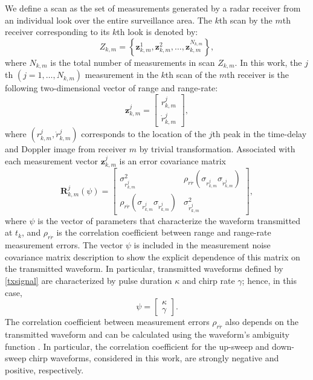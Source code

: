 \documentclass[times]{asjcauth}
\begin{document}
We define a scan as the set of measurements generated by a radar receiver from an individual look over the entire surveillance area. The $k$th scan by the $m$th receiver corresponding to its $k$th look is denoted by:
\begin{equation*}
Z_{k,m} =
\left\{\mathbf{z}_{k,m}^{1},\mathbf{z}_{k,m}^{2},\ldots,\mathbf{z}_{k,m}^{N_{k,m}}\right\},
\end{equation*}
where $N_{k,m}$ is the total number of measurements in scan $Z_{k,m}$. In this work, the $j$th $\left(j=1,\ldots,N_{k,m}\right)$ measurement in the $k$th scan of the $m$th receiver is the following two-dimensional vector of range and range-rate:
\begin{equation*}
\mathbf{z}_{k,m}^{j} = \left[
\begin{array}{c}
  r_{k,m}^{j} \\
  \dot{r}_{k,m}^{j}
\end{array}
\right],
\end{equation*}
\noindent where $\left(r_{k,m}^{j},\dot{r}_{k,m}^{j}\right)$ corresponds to the location of the $j$th peak in the time-delay and Doppler image from receiver $m$ by trivial transformation. Associated with each measurement vector $\mathbf{z}_{k,m}^{j}$ is an error covariance matrix
\begin{equation*}
\mathbf{R}_{k,m}^{j}(\psi) = \left[
\begin{array}{cc}
  \sigma_{r_{k,m}^{j}}^{2} & \rho_{r\dot{r}}\left(\sigma_{r_{k,m}^{j}}\sigma_{\dot{r}_{k,m}^{j}}\right)\\
  \rho_{r\dot{r}}\left(\sigma_{r_{k,m}^{j}}\sigma_{\dot{r}_{k,m}^{j}}\right) & \sigma_{\dot{r}_{k,m}^{j}}^{2}
\end{array}
\right],
\end{equation*}
\noindent where $\psi$ is the vector of parameters that characterize the waveform transmitted at $t_{k}$, and $\rho_{r\dot{r}}$ is the correlation coefficient between range and range-rate measurement errors. The vector $\psi$ is included in the measurement noise covariance matrix description to show the explicit dependence of this matrix on the transmitted waveform. In particular, transmitted waveforms defined by \eqref{txsignal} are characterized by pulse duration $\kappa$ and chirp rate $\gamma$; hence, in this case,
\begin{equation*}
\psi = \left[\begin{array}{c}
               \kappa \\
               \gamma
             \end{array}
\right].
\end{equation*}
\noindent The correlation coefficient between measurement errors $\rho_{r\dot{r}}$ also depends on the transmitted waveform and can be calculated using the waveform's ambiguity function \cite{mediterranean}. In particular, the correlation coefficient for the up-sweep and down-sweep chirp waveforms, considered in this work, are strongly negative and positive, respectively.
\end{document}
